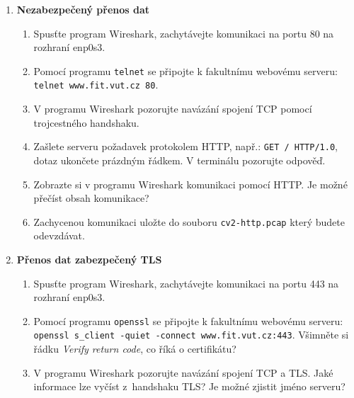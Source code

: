\documentclass[a4paper,11pt]{article}
\begin{document}
\begin{enumerate}

  \item {\bf  Nezabezpečený přenos dat}

    \begin{enumerate}

      \item Spusťte program Wireshark, zachytávejte komunikaci na portu 80 na rozhraní enp0s3.

      \item Pomocí programu {\tt telnet} se připojte k fakultnímu webovému serveru: \\
        \verb|telnet www.fit.vut.cz 80|.

      \item V programu Wireshark pozorujte navázání spojení TCP pomocí trojcestného handshaku.

      \item Zašlete serveru požadavek protokolem HTTP, např.:
        \verb|GET / HTTP/1.0|, dotaz ukončete prázdným řádkem.
        V terminálu pozorujte odpověď.

      \item Zobrazte si v programu Wireshark komunikaci pomocí HTTP.
        Je možné přečíst obsah komunikace?

      \item Zachycenou komunikaci uložte do souboru {\tt cv2-http.pcap} který budete odevzdávat.

    \end{enumerate}

  \item {\bf Přenos dat zabezpečený TLS}

    \begin{enumerate}

      \item Spusťte program Wireshark, zachytávejte komunikaci na portu 443 na rozhraní enp0s3.

      \item Pomocí programu {\tt openssl} se připojte k fakultnímu webovému serveru: \\
        \verb|openssl s_client -quiet -connect www.fit.vut.cz:443|.
        Všimněte si řádku \emph{Verify return code}, co říká o certifikátu?

      \item V programu Wireshark pozorujte navázání spojení TCP a TLS. Jaké
        informace lze vyčíst z~handshaku TLS? Je možné zjistit jméno serveru?


\end{enumerate}
\end{enumerate}
\end{document}
